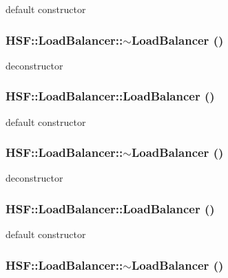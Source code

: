 default constructor \hypertarget{classHSF_1_1LoadBalancer_aa03846f31ea99f255b23adf0777cf373}{
\subsubsection[{$\sim$LoadBalancer}]{\setlength{\rightskip}{0pt plus 5cm}HSF::LoadBalancer::$\sim$LoadBalancer ()}}
\label{classHSF_1_1LoadBalancer_aa03846f31ea99f255b23adf0777cf373}


deconstructor \hypertarget{classHSF_1_1LoadBalancer_af9fd71150f3cd1b8c4f87023b916dedc}{
\subsubsection[{LoadBalancer}]{\setlength{\rightskip}{0pt plus 5cm}HSF::LoadBalancer::LoadBalancer ()}}
\label{classHSF_1_1LoadBalancer_af9fd71150f3cd1b8c4f87023b916dedc}


default constructor \hypertarget{classHSF_1_1LoadBalancer_aa03846f31ea99f255b23adf0777cf373}{
\subsubsection[{$\sim$LoadBalancer}]{\setlength{\rightskip}{0pt plus 5cm}HSF::LoadBalancer::$\sim$LoadBalancer ()}}
\label{classHSF_1_1LoadBalancer_aa03846f31ea99f255b23adf0777cf373}


deconstructor \hypertarget{classHSF_1_1LoadBalancer_af9fd71150f3cd1b8c4f87023b916dedc}{
\subsubsection[{LoadBalancer}]{\setlength{\rightskip}{0pt plus 5cm}HSF::LoadBalancer::LoadBalancer ()}}
\label{classHSF_1_1LoadBalancer_af9fd71150f3cd1b8c4f87023b916dedc}


default constructor \hypertarget{classHSF_1_1LoadBalancer_aa03846f31ea99f255b23adf0777cf373}{
\subsubsection[{$\sim$LoadBalancer}]{\setlength{\rightskip}{0pt plus 5cm}HSF::LoadBalancer::$\sim$LoadBalancer ()}}
\label{classHSF_1_1LoadBalancer_aa03846f31ea99f255b23adf0777cf373}


